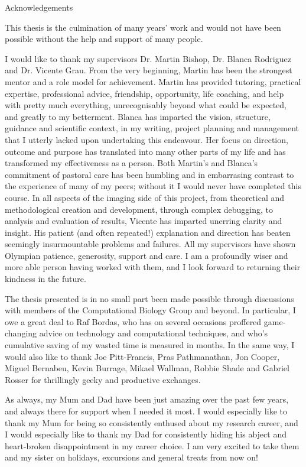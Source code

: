\vspace*{20mm}
{
\Large\bf
\begin{center}
Acknowledgements
\end{center}
}

This thesis is the culmination of many years' work and would not have been possible without the help and support of many people. 

I would like to thank my supervisors Dr. Martin Bishop, Dr. Blanca Rodriguez and Dr. Vicente Grau. From the very beginning, Martin has been the strongest mentor and a role model for achievement. Martin has provided tutoring, practical expertise, professional advice, friendship, opportunity, life coaching, and help with pretty much everything, unrecognisably beyond what could be expected, and greatly to my betterment. Blanca has imparted the vision, structure, guidance and scientific context, in my writing, project planning and management that I utterly lacked upon undertaking this endeavour. Her focus on direction, outcome and purpose has translated into many other parts of my life and has transformed my effectiveness as a person. Both Martin's and Blanca's commitment of pastoral care has been humbling and in embarrasing contrast to the experience of many of my peers; without it I would never have completed this course. In all aspects of the imaging side of this project, from theoretical and methodological creation and development, through complex debugging, to analysis and evaluation of results, Vicente has imparted unerring clarity and insight. His patient (and often repeated!) explanation and direction has beaten seemingly insurmountable problems and failures. All my supervisors have shown Olympian patience, generosity, support and care. I am a profoundly wiser and more able person having worked with them, and I look forward to returning their kindness in the future.

The thesis presented is in no small part been made possible through discussions with members of the Computational Biology Group and beyond. In particular, I owe a great deal to Raf Bordas, who has on several occasions proffered game-changing advice on technology and computational techniques, and who's cumulative saving of my wasted time is measured in months. In the same way, I would also like to thank Joe Pitt-Francis, Pras Pathmanathan, Jon Cooper, Miguel Bernabeu, Kevin Burrage, Mikael Wallman, Robbie Shade and Gabriel Rosser for thrillingly geeky and productive exchanges.

As always, my Mum and Dad have been just amazing over the past few years, and always there for support when I needed it most. I would especially like to thank my Mum for being so consistently enthused about my research career, and I would especially like to thank my Dad for consistently hiding his abject and heart-broken disappointment in my career choice. I am very excited to take them and my sister on holidays, excursions and general treats from now on!

